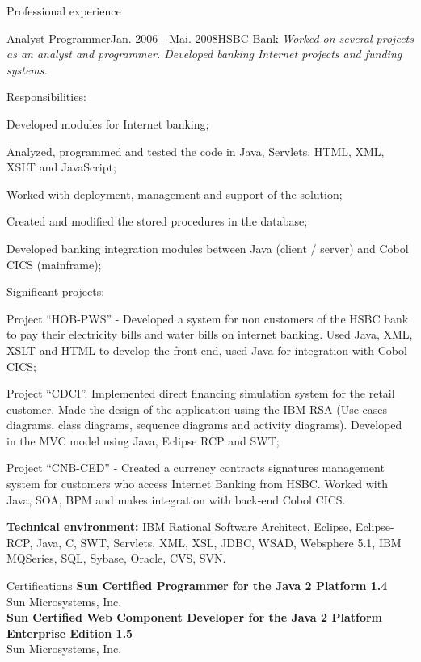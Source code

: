 \documentclass{resume}
\begin{document}
\begin{rSection}{Professional experience}
\begin{rSubsection}{\fontsize{12}{14}\selectfont Analyst Programmer}{\fontsize{12}{14}\selectfont Jan. 2006 - Mai. 2008}{\fontsize{12}{14}\selectfont HSBC Bank}{}
    \textit{Worked on several projects as an analyst and programmer. Developed banking Internet projects and funding systems.}
    \end{rSubsection}
      \begin{rSubsection}{\fontsize{9}{10}\selectfont Responsibilities:}{}{}{}
        \item Developed modules for Internet banking;
        \item Analyzed, programmed and tested the code in Java, Servlets, HTML, XML, XSLT and JavaScript;
        \item Worked with deployment, management and support of the solution;
        \item Created and modified the stored procedures in the database;
        \item Developed banking integration modules between Java (client / server) and Cobol CICS (mainframe);
      \end{rSubsection}

      \begin{rSubsection}{\fontsize{9}{10}\selectfont Significant projects:}{}{}{}
        \item Project “HOB-PWS” - Developed a system for non customers of the HSBC bank to pay their electricity bills and water bills on internet banking. Used Java, XML, XSLT and HTML to develop the front-end, used Java for integration with Cobol CICS;
        \item Project “CDCI”. Implemented direct financing simulation system for the retail customer. Made the design of the application using the IBM RSA (Use cases diagrams, class diagrams, sequence diagrams and activity diagrams). Developed in the MVC model using Java, Eclipse RCP and SWT;
        \item Project “CNB-CED” - Created a currency contracts signatures management system for customers who access Internet Banking from HSBC. Worked with Java, SOA, BPM and makes integration with back-end Cobol CICS.
      \end{rSubsection}

      {\fontsize{8}{9}\selectfont \textbf{Technical environment:} IBM Rational Software Architect, Eclipse, Eclipse-RCP, Java, C, SWT, Servlets, XML, XSL, JDBC, WSAD, Websphere 5.1, IBM MQSeries, SQL, Sybase, Oracle, CVS, SVN.}

  \end{rSection}

  \begin{rSection}{Certifications}
    {\bf Sun Certified Programmer for the Java 2 Platform 1.4}\\ 
    {Sun Microsystems, Inc.} \\

    {\bf Sun Certified Web Component Developer for the Java 2 Platform Enterprise Edition 1.5}\\ 
    {Sun Microsystems, Inc.} \\
  \end{rSection}
\end{document}
